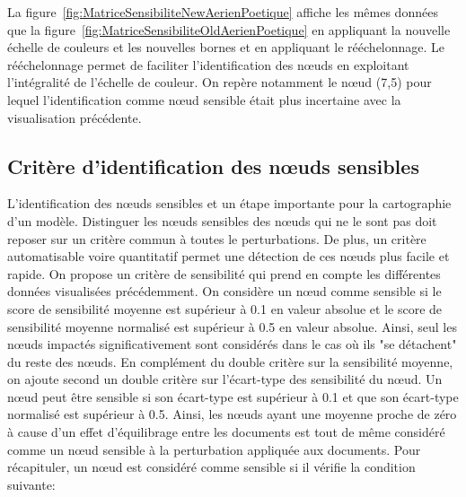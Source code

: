         La figure~\ref{fig:MatriceSensibiliteNewAerienPoetique} affiche les mêmes données que la figure~\ref{fig:MatriceSensibiliteOldAerienPoetique} en appliquant la nouvelle échelle de couleurs et les nouvelles bornes et en appliquant le rééchelonnage. Le rééchelonnage permet de faciliter l'identification des nœuds en exploitant l'intégralité de l'échelle de couleur. On repère notamment le nœud (7,5) pour lequel l'identification comme nœud sensible était plus incertaine avec la visualisation précédente. 
        
    


    \subsection{Critère d'identification des nœuds sensibles}

        L'identification des nœuds sensibles et un étape importante pour la cartographie d'un modèle. Distinguer les nœuds sensibles des nœuds qui ne le sont pas doit reposer sur un critère commun à toutes le perturbations. De plus, un critère automatisable voire quantitatif permet une détection de ces nœuds plus facile et rapide. On propose un critère de sensibilité qui prend en compte les différentes données visualisées précédemment. On considère un nœud comme sensible si le score de sensibilité moyenne est supérieur à 0.1 en valeur absolue et le score de sensibilité moyenne normalisé est supérieur à 0.5 en valeur absolue. Ainsi, seul les nœuds impactés significativement sont considérés dans le cas où ils "se détachent" du reste des nœuds. En complément du double critère sur la sensibilité moyenne, on ajoute second un double critère sur l'écart-type des sensibilité du nœud. Un nœud peut être sensible si son écart-type est supérieur à 0.1 et que son écart-type normalisé est supérieur à 0.5. Ainsi, les nœuds ayant une moyenne proche de zéro à cause d'un effet d'équilibrage entre les documents est tout de même considéré comme un nœud sensible à la perturbation appliquée aux documents. Pour récapituler, un nœud est considéré comme sensible si il vérifie la condition suivante:

